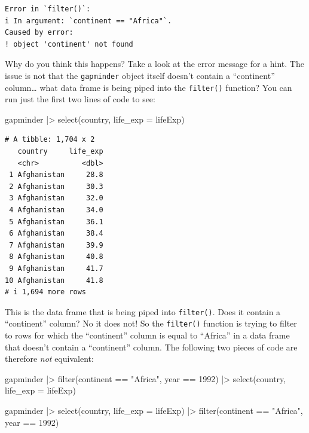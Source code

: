 \documentclass[
  letterpaper,
  DIV=11,
  numbers=noendperiod]{scrreprt}
\newenvironment{Shaded}{\begin{snugshade}}{\end{snugshade}}
\newcommand{\AttributeTok}[1]{\textcolor[rgb]{0.40,0.45,0.13}{#1}}
\newcommand{\DecValTok}[1]{\textcolor[rgb]{0.68,0.00,0.00}{#1}}
\newcommand{\FunctionTok}[1]{\textcolor[rgb]{0.28,0.35,0.67}{#1}}
\newcommand{\NormalTok}[1]{\textcolor[rgb]{0.00,0.23,0.31}{#1}}
\newcommand{\SpecialCharTok}[1]{\textcolor[rgb]{0.37,0.37,0.37}{#1}}
\newcommand{\StringTok}[1]{\textcolor[rgb]{0.13,0.47,0.30}{#1}}
\begin{document}
\begin{verbatim}
Error in `filter()`:
i In argument: `continent == "Africa"`.
Caused by error:
! object 'continent' not found
\end{verbatim}

Why do you think this happens? Take a look at the error message for a
hint. The issue is not that the \texttt{gapminder} object itself doesn't
contain a ``continent'' column\ldots{} what data frame is being piped
into the \texttt{filter()} function? You can run just the first two
lines of code to see:

\begin{Shaded}
\begin{Highlighting}[]
\NormalTok{gapminder }\SpecialCharTok{|\textgreater{}} 
  \FunctionTok{select}\NormalTok{(country, }\AttributeTok{life\_exp =}\NormalTok{ lifeExp) }
\end{Highlighting}
\end{Shaded}

\begin{verbatim}
# A tibble: 1,704 x 2
   country     life_exp
   <chr>          <dbl>
 1 Afghanistan     28.8
 2 Afghanistan     30.3
 3 Afghanistan     32.0
 4 Afghanistan     34.0
 5 Afghanistan     36.1
 6 Afghanistan     38.4
 7 Afghanistan     39.9
 8 Afghanistan     40.8
 9 Afghanistan     41.7
10 Afghanistan     41.8
# i 1,694 more rows
\end{verbatim}

This is the data frame that is being piped into \texttt{filter()}. Does
it contain a ``continent'' column? No it does not! So the
\texttt{filter()} function is trying to filter to rows for which the
``continent'' column is equal to ``Africa'' in a data frame that doesn't
contain a ``continent'' column. The following two pieces of code are
therefore \emph{not} equivalent:

\begin{Shaded}
\begin{Highlighting}[]
\NormalTok{gapminder }\SpecialCharTok{|\textgreater{}} 
  \FunctionTok{filter}\NormalTok{(continent }\SpecialCharTok{==} \StringTok{"Africa"}\NormalTok{, year }\SpecialCharTok{==} \DecValTok{1992}\NormalTok{) }\SpecialCharTok{|\textgreater{}}
  \FunctionTok{select}\NormalTok{(country, }\AttributeTok{life\_exp =}\NormalTok{ lifeExp) }
\end{Highlighting}
\end{Shaded}

\begin{Shaded}
\begin{Highlighting}[]
\NormalTok{gapminder }\SpecialCharTok{|\textgreater{}} 
  \FunctionTok{select}\NormalTok{(country, }\AttributeTok{life\_exp =}\NormalTok{ lifeExp) }\SpecialCharTok{|\textgreater{}}
  \FunctionTok{filter}\NormalTok{(continent }\SpecialCharTok{==} \StringTok{"Africa"}\NormalTok{, year }\SpecialCharTok{==} \DecValTok{1992}\NormalTok{) }
\end{Highlighting}
\end{Shaded}
\end{document}
